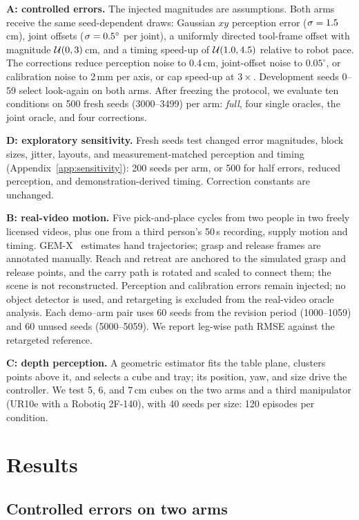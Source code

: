 \documentclass{article}
\begin{document}
\textbf{A: controlled errors.} The injected magnitudes are assumptions. Both arms receive the same seed-dependent draws: Gaussian $xy$ perception error
($\sigma=1.5$\,cm), joint offsets ($\sigma=0.5^\circ$ per joint),
a uniformly directed tool-frame offset with magnitude $\mathcal{U}(0,3)$\,cm, and a timing
speed-up of $\mathcal{U}(1.0,4.5)$ relative to robot pace. The corrections reduce perception
noise to 0.4\,cm, joint-offset noise to $0.05^\circ$, or calibration noise to 2\,mm per axis, or cap
speed-up at $3\times$. Development seeds 0--59 select look-again on both arms. After freezing the
protocol, we evaluate ten conditions on 500 fresh seeds (3000--3499) per arm: \emph{full}, four single oracles, the joint oracle, and four corrections.

\textbf{D: exploratory sensitivity.} Fresh seeds test changed error magnitudes, block sizes, jitter, layouts, and measurement-matched perception and timing (Appendix~\ref{app:sensitivity}): 200 seeds per arm, or 500 for half errors, reduced perception, and demonstration-derived timing. Correction constants are unchanged.

\textbf{B: real-video motion.} Five pick-and-place cycles from two people in two freely licensed videos,
plus one from a third person's 50\,s recording, supply motion and timing. GEM-X~\citep{gemx}
estimates hand trajectories; grasp and release frames are annotated manually. Reach and retreat
are anchored to the simulated grasp and release points, and the carry path is rotated and scaled to connect them; the scene is not reconstructed. Perception and calibration errors remain injected; no object
detector is used, and retargeting is excluded from the real-video oracle analysis. Each demo--arm pair uses 60 seeds from the revision period (1000--1059) and 60 unused seeds (5000--5059). We report leg-wise path RMSE against the retargeted reference.

\textbf{C: depth perception.} A geometric estimator fits the table plane, clusters points above it, and selects a cube and tray; its position, yaw, and size drive the controller. We test 5, 6, and 7\,cm cubes on the two arms and a third manipulator
(UR10e with a Robotiq 2F-140), with 40 seeds per size: 120 episodes per condition.

\section{Results}

\subsection{Controlled errors on two arms}
\end{document}
